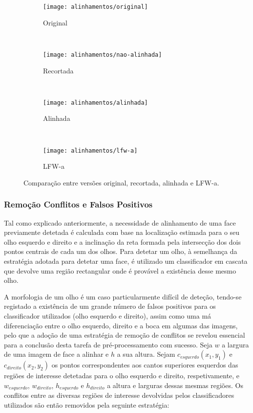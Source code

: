 \begin{figure}[t]
        \centering
        \begin{subfigure}[b]{0.2\textwidth}
                \centering
                \texttt{[image: alinhamentos/original]}
                \caption{Original}
                \label{fig:alinha_original}
        \end{subfigure}%
        ~ 
        \begin{subfigure}[b]{0.2\textwidth}
                \centering
                \texttt{[image: alinhamentos/nao-alinhada]}
                \caption{Recortada}
                \label{fig:alinha_nao-alinhada}
        \end{subfigure}
        ~ 
        \begin{subfigure}[b]{0.2\textwidth}
                \centering
                \texttt{[image: alinhamentos/alinhada]}
                \caption{Alinhada}
                \label{fig:alinha_alinhada}
        \end{subfigure}
        ~ 
        \begin{subfigure}[b]{0.2\textwidth}
                \centering
                \texttt{[image: alinhamentos/lfw-a]}
                \caption{LFW-a}
                \label{fig:alinha_lfw-a}
        \end{subfigure}
        \caption{Comparação entre versões original, recortada, alinhada e LFW-a.}\label{fig:alinhamentos}
\end{figure}

\subsubsection*{Remoção Conflitos e Falsos Positivos}
Tal como explicado anteriormente, a necessidade de alinhamento de uma face previamente detetada é calculada com base na localização estimada para o seu olho esquerdo e direito e a inclinação da reta formada pela intersecção dos dois pontos centrais de cada um dos olhos. Para detetar um olho, à semelhança da estratégia adotada para detetar uma face, é utilizado um classificador em cascata que devolve uma região rectangular onde é provável a existência desse mesmo olho. 

A morfologia de um olho é um caso particularmente difícil de deteção, tendo-se registado a existência de um grande número de falsos positivos para os classificador utilizados (olho esquerdo e direito), assim como uma má diferenciação entre o olho esquerdo, direito e a boca em algumas das imagens, pelo que a adoção de uma estratégia de remoção de conflitos se revelou essencial para a conclusão desta tarefa de pré-processamento com sucesso. Seja $w$ a largura de uma imagem de face a alinhar e $h$ a sua altura. Sejam $c_{esquerdo}(x_1,y_1)$ e  $c_{direito}(x_2,y_2)$  os pontos correspondentes aos cantos superiores esquerdos das regiões de interesse detetadas para o olho esquerdo e direito, respetivamente, e $w_{esquerdo}$, $w_{direito}$, $h_{esquerdo}$ e $h_{direito}$ a altura e larguras dessas mesmas regiões. Os conflitos entre as diversas regiões de interesse devolvidas pelos classificadores utilizados são então removidos pela seguinte estratégia:

